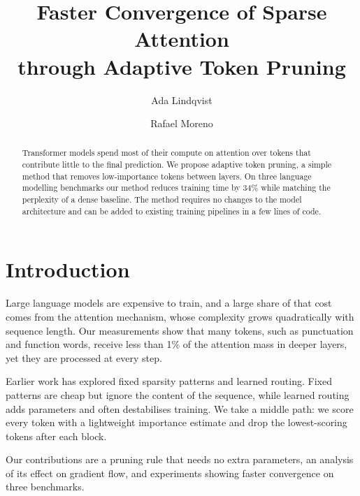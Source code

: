\documentclass[11pt]{article}
\title{Faster Convergence of Sparse Attention\\through Adaptive Token Pruning}
\author{Ada Lindqvist \and Rafael Moreno}
\date{}
\begin{document}
\maketitle
\begin{abstract}
Transformer models spend most of their compute on attention over tokens that contribute little to the
final prediction. We propose adaptive token pruning, a simple method that removes low-importance tokens
between layers. On three language modelling benchmarks our method reduces training time by 34\% while
matching the perplexity of a dense baseline. The method requires no changes to the model architecture and can be added to existing training pipelines in a few lines of code.
\end{abstract}

\section{Introduction}
Large language models are expensive to train, and a large share of that cost comes from the attention
mechanism, whose complexity grows quadratically with sequence length. Our measurements show that many tokens, such as punctuation
and function words, receive less than 1\% of the attention mass in deeper layers, yet they are processed at every step.

Earlier work has explored fixed sparsity patterns and learned routing. Fixed patterns are cheap but
ignore the content of the sequence, while learned routing adds parameters and often destabilises training. We take
a middle path: we score every token with a lightweight importance estimate and drop the lowest-scoring
tokens after each block.

Our contributions are a pruning rule that needs no extra parameters, an analysis of its effect on
gradient flow, and experiments showing faster convergence on three benchmarks.
\end{document}
